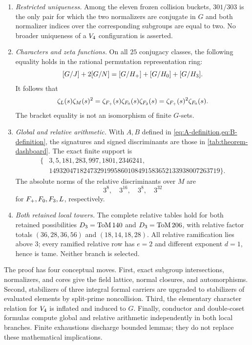 \begin{theorem}
\begin{enumerate}[label=\textup{(\roman*)},leftmargin=2.8em]
\item \emph{Restricted uniqueness.}  Among the eleven frozen collision
buckets, $301/303$ is the only pair for which the two normalizers are
conjugate in $G$ and both normalizer indices over the corresponding
subgroups are equal to two.  No broader uniqueness of a $V_4$
configuration is asserted.

\item \emph{Characters and zeta functions.}  On all $25$ conjugacy
classes, the following equality holds in the rational permutation
representation ring:
\[
 [G/J]+2[G/N]=[G/H_{+}]+[G/H_{0}]+[G/H_{3}].
\]
It follows that
\[
 \zeta_L(s)\zeta_M(s)^2
 =\zeta_{F_{+}}(s)\zeta_{F_{0}}(s)\zeta_{F_{3}}(s)
 =\zeta_{F_{+}}(s)^2\zeta_{F_{0}}(s).
\]
The bracket equality is not an isomorphism of finite $G$-sets.

\item \emph{Global and relative arithmetic.}  With $A,B$ defined in
\cref{eq:A-definition,eq:B-definition}, the signatures and signed
discriminants are those in \cref{tab:theorem-dashboard}.  The exact finite
support is
\[
 \begin{aligned}
 \{&3,5,181,283,997,1801,2346241,\\
   &14932047182473291995860108491583652133938007263719\}.
 \end{aligned}
\]
The absolute norms of the relative discriminants over $M$ are
\[
 3^8,\quad3^{16},\quad3^8,\quad3^{32}
\]
for $F_{+},F_{0},F_{3},L$, respectively.

\item \emph{Both retained local towers.}  The complete relative tables hold
for both retained possibilities $D_3=\mathrm{ToM}\,140$ and $D_3=\mathrm{ToM}\,206$, with
relative factor totals $(36,28,36,56)$ and $(18,14,18,28)$.  All relative
ramification lies above $3$; every ramified relative row has $e=2$ and
different exponent $d=1$, hence is tame.  Neither branch is selected.
\end{enumerate}
\end{theorem}



The proof has four conceptual moves.  First, exact subgroup intersections,
normalizers, and cores give the field lattice, normal closures, and
automorphisms.  Second, stabilizers of three integral formal carriers are
upgraded to stabilizers of evaluated elements by split-prime noncollision.
Third, the elementary character relation for $V_4$ is inflated and
induced to $G$.  Finally, conductor and double-coset formulas compute global
and relative arithmetic independently in both local branches.  Finite
exhaustions discharge bounded lemmas; they do not replace these mathematical
implications.

